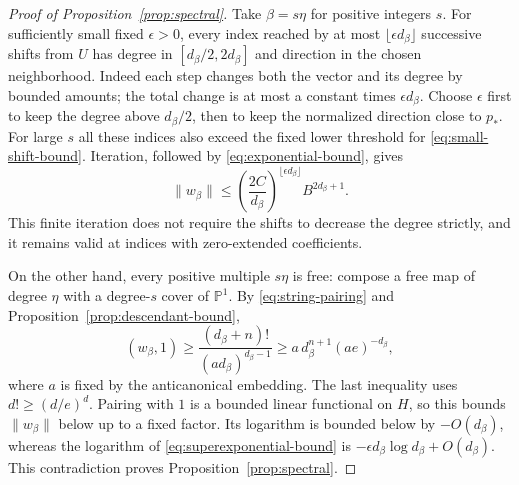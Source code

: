 \begin{proof}[Proof of Proposition~\ref{prop:spectral}]
Take $\beta=s\eta$ for positive integers $s$. For sufficiently small
fixed $\epsilon>0$, every index reached by at most
$\lfloor\epsilon d_\beta\rfloor$ successive shifts from $U$ has degree
in $[d_\beta/2,2d_\beta]$ and direction in the chosen neighborhood.
Indeed each step changes both the vector and its degree by bounded
amounts; the total change is at most a constant times
$\epsilon d_\beta$. Choose $\epsilon$ first to keep the degree above
$d_\beta/2$, then to keep the normalized direction close to $p_*$.
For large $s$ all these indices also exceed the fixed lower threshold
for \eqref{eq:small-shift-bound}. Iteration, followed by
\eqref{eq:exponential-bound}, gives
\begin{equation}\label{eq:superexponential-bound}
 \|w_\beta\|\le
 \left(\frac{2C}{d_\beta}\right)^{\lfloor\epsilon d_\beta\rfloor}
 B^{2d_\beta+1}.
\end{equation}
This finite iteration does not require the shifts to decrease the
degree strictly, and it remains valid at indices with zero-extended
coefficients.

On the other hand, every positive multiple $s\eta$ is free: compose a
free map of degree $\eta$ with a degree-$s$ cover of $\mathbb P^1$.
By \eqref{eq:string-pairing} and
Proposition~\ref{prop:descendant-bound},
\[
 (w_\beta,1)
 \ge\frac{(d_\beta+n)!}{(a d_\beta)^{d_\beta-1}}
 \ge a\,d_\beta^{n+1}(ae)^{-d_\beta},
\]
where $a$ is fixed by the anticanonical embedding. The last inequality
uses $d!\ge(d/e)^d$. Pairing with $1$ is a bounded linear functional on
$H$, so this bounds $\|w_\beta\|$ below up to a fixed factor.
Its logarithm is bounded below by $-O(d_\beta)$, whereas the logarithm
of \eqref{eq:superexponential-bound} is
$-\epsilon d_\beta\log d_\beta+O(d_\beta)$. This contradiction proves
Proposition~\ref{prop:spectral}.
\end{proof}
